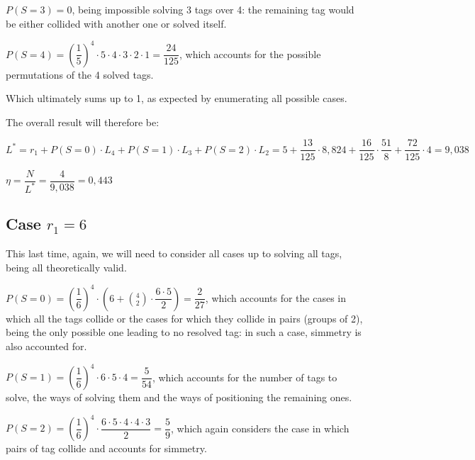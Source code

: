 \documentclass[a4paper,11pt]{article} %
\begin{document}
\medskip

$P(S = 3) = 0$, being impossible solving 3 tags over 4: the remaining tag would be either collided with another one or solved itself.

\medskip

$P(S = 4) = \left(\dfrac{1}{5}\right)^4 \cdot 5 \cdot 4 \cdot 3 \cdot 2 \cdot 1 = \dfrac{24}{125}$, which accounts for the possible permutations of the 4 solved tags.

\medskip

Which ultimately sums up to 1, as expected by enumerating all possible cases.

\bigskip

The overall result will therefore be:

\medskip

$L^{*} = r_1 + P(S = 0) \cdot L_4 + P(S = 1) \cdot L_3 + P(S = 2) \cdot L_2 = 5 + \dfrac{13}{125} \cdot 8,824 + \dfrac{16}{125} \cdot \dfrac{51}{8} + \dfrac{72}{125} \cdot 4 = 9,038$

\medskip

$\eta = \dfrac{N}{L^{*}} = \dfrac{4}{9,038} = 0,443$

\subsection{Case $r_1 = 6$}

This last time, again, we will need to consider all cases up to solving all tags, being all theoretically valid.

\medskip

$P(S = 0) = \left(\dfrac{1}{6}\right)^4 \cdot \left(6 + \displaystyle \binom{4}{2} \cdot \dfrac{6 \cdot 5}{2}\right) = \dfrac{2}{27}$, which accounts for the cases in which all the tags collide or the cases for which they collide in pairs (groups of 2), being the only possible one leading to no resolved tag: in such a case, simmetry is also accounted for.

\medskip

$P(S = 1) = \left(\dfrac{1}{6}\right)^4 \cdot 6 \cdot 5 \cdot 4 = \dfrac{5}{54}$, which accounts for the number of tags to solve, the ways of solving them and the ways of positioning the remaining ones.

\medskip

$P(S = 2) = \left(\dfrac{1}{6}\right)^4 \cdot \dfrac{6 \cdot 5 \cdot 4 \cdot 4 \cdot 3}{2} = \dfrac{5}{9}$, which again considers the case in which pairs of tag collide and accounts for simmetry.
\end{document}
